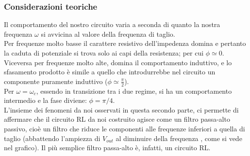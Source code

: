 \subsubsection{Considerazioni teoriche}
Il comportamento del nostro circuito varia a seconda di quanto la nostra frequenza $\omega$ si avvicina al valore della frequenza di taglio. \\
Per frequenze molto basse il carattere resistivo dell'impedenza domina e pertanto la caduta di potenziale si trova solo ai capi della resistenza; per cui $ \phi \simeq 0$. Viceversa per frequenze molto alte, domina il comportamento induttivo, e lo sfasamento prodotto è simile a quello che introdurrebbe nel circuito un componente puramente induttivo ($\phi \simeq \frac{\pi}{2}$).  \\
Per $\omega = \omega_c$, essendo in transizione tra i due regime, si ha un comportamento intermedio e la fase diviene: $ \phi = \pi/4$. \\

L'insieme dei fenomeni da noi osservati in questa secondo parte, ci permette di affermare che il circuito RL da noi costruito agisce come un filtro passa-alto passivo, cioè un filtro che riduce le componenti alle frequenze inferiori a quella di taglio (abbattendo l'ampiezza di $V_{out}$ al diminuire della frequenza , come si vede nel grafico). Il più semplice filtro passa-alto è, infatti, un circuito RL. 


